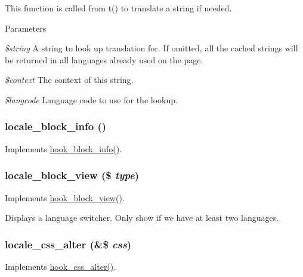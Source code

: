 This function is called from t() to translate a string if needed.


\begin{DoxyParams}{Parameters}
\item[{\em \$string}]A string to look up translation for. If omitted, all the cached strings will be returned in all languages already used on the page. \item[{\em \$context}]The context of this string. \item[{\em \$langcode}]Language code to use for the lookup. \end{DoxyParams}
\hypertarget{locale_8module_a925049f0f5d2fd9807dc5e8288211b9f}{
\subsubsection[{locale\_\-block\_\-info}]{\setlength{\rightskip}{0pt plus 5cm}locale\_\-block\_\-info ()}}
\label{locale_8module_a925049f0f5d2fd9807dc5e8288211b9f}
Implements \hyperlink{group__hooks_ga2bd926c3e90deeba0c3ba64fb3c64d73}{hook\_\-block\_\-info()}. \hypertarget{locale_8module_a3f0dec6a460840ac379294be6db21437}{
\subsubsection[{locale\_\-block\_\-view}]{\setlength{\rightskip}{0pt plus 5cm}locale\_\-block\_\-view (\$ {\em type})}}
\label{locale_8module_a3f0dec6a460840ac379294be6db21437}
Implements \hyperlink{group__hooks_gaa14092a3e74cdc57aa295100cfd6860d}{hook\_\-block\_\-view()}.

Displays a language switcher. Only show if we have at least two languages. \hypertarget{locale_8module_a0767007b96aa70dfc1b4bdcde924b5f3}{
\subsubsection[{locale\_\-css\_\-alter}]{\setlength{\rightskip}{0pt plus 5cm}locale\_\-css\_\-alter (\&\$ {\em css})}}
\label{locale_8module_a0767007b96aa70dfc1b4bdcde924b5f3}
Implements \hyperlink{group__hooks_ga5337e8bfa5713fb37c132f039c0169da}{hook\_\-css\_\-alter()}.

